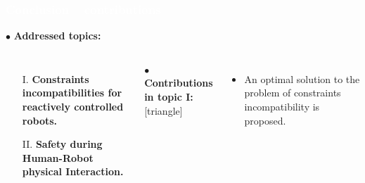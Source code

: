 \begin{frame}[noframenumbering]
\frametitle{{\textcolor{white}{\hspace{0.3cm}Conclusion -- contributions}}}


\hspace{-6mm}
$\bullet$ {\color{blue-violet}\textbf{Addressed topics:}}
\begin{columns}
\column{\paperwidth-10mm}
\begin{itemize}
\item[I.]  {\color{red}\textbf{Constraints incompatibilities for reactively controlled robots.}}
\item[II.] {\color{red}\textbf{Safety during Human-Robot physical Interaction.}}
\end{itemize}
\vspace{5mm}

$\bullet$ {\color{ao(english)}\textbf{Contributions in topic I:}}
[triangle] 
\begin{itemize}
\item An optimal solution to the problem of constraints incompatibility is proposed.

\end{itemize}

\end{columns}
\end{frame}




